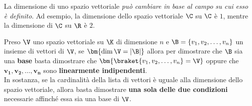 \documentclass[11pt, a4paper, titlepage, oneside]{scrbook}
\begin{document}
La dimensione di uno spazio vettoriale \textit{può cambiare in base al campo su cui esso è definito}. Ad esempio, la dimensione dello spazio vettoriale $\C$ su $\C$ è $1$, mentre la dimensione di $\C$ su $\R$ è $2$. 

\begin{Osservazione}[]
\label{oss-dimen}
Preso $\V$ uno spazio vettoriale su $\K$ di dimensione $n$ e $\B = \{v_1, v_2, \ldots, v_n\}$ un insieme di vettori di $\V$, se $\bm{\dim \V = \lvert \B \rvert}$ allora per dimostrare che $\B$ sia una \textbf{base} basta dimostrare che $\bm{\braket{v_1, v_2, \ldots, v_n} = \V}$ oppure che $\bm{v_1, v_2, \ldots, v_n}$ sono \textbf{linearmente indipendenti}. \\
In sostanza, se la cardinalità della lista di vettori è uguale alla dimensione dello spazio vettoriale, allora basta dimostrare \textbf{una sola delle due condizioni} necessarie affinché essa sia una base di $\V$.
\end{Osservazione}

\Dimostrazione \nopagebreak
\end{document}

